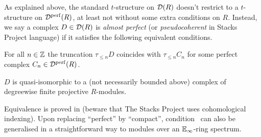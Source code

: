 \documentclass[a4paper, 10pt, oneside, DIV=9, chapterprefix=true, numbers=enddot,bibliography=totoc]{scrbook}
\begin{document}
\label{par:GTheory}
As explained above, the standard $t$-structure on $\mathcal{D}(R)$ doesn't restrict to a $t$-structure on $\mathcal{D}^{\mathrm{perf}}(R)$, at least not without some extra conditions on $R$. Instead, we say a complex $D\in \mathcal{D}(R)$ is \emph{almost perfect} (or \emph{pseudocoherent} in Stacks Project language) if it satisfies the following equivalent conditions.
\begin{alphanumerate}
	\item For all $n\in \mathbb{Z}$ the truncation $\tau_{\leq n}D$ coincides with $\tau_{\leq n}C_n$ for some perfect complex $C_n\in \mathcal{D}^{\mathrm{perf}}(R)$.
	\item $D$ is quasi-isomorphic to a (not necessarily bounded above) complex of degreewise finite projective $R$-modules.
\end{alphanumerate}
Equivalence is proved in \cite[]{stacks-project} (beware that The Stacks Project uses cohomological indexing). Upon replacing \enquote{perfect} by \enquote{compact}, condition~ can also be generalised in a straightforward way to modules over an $\mathbb{E}_\infty$-ring spectrum.
\end{document}
